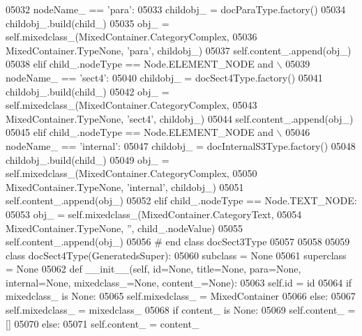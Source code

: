 \begin{DoxyCode}
{{{{{{{{{{{{{{{{{{{{{{{{{{{{{{{{{{{{{{{{{{{{{{{{{{{{{{{{{{{{{{{{{{{{{{{{{{{{{{{{{{{{{{{{{{{{{{{{{{{{{{{{{{{{{{{{{{{{{{{{{{{{{{{{{{{{{{{{{{{{{{{{{{{{{{{{{{{{{{{{{{{{{{{{{{{{{{{{{{{{{{{{{{{{{{{{{{{{{{{{{{{{{{{{{{{{{{{{{{{{{{{{{{{{{{{{{{{{{{{{{{{{{{{{{{{{{{{{{{{{{{{{{{{{{{{{{{{{{{{{{{{{{{{{{{{{{{{{{{{{{{{{{{{{{{{{{{{{{{{{{{{{{{{{{{{{05032             nodeName\_ == \textcolor{stringliteral}{'para'}:
05033             childobj\_ = docParaType.factory()
05034             childobj\_.build(child\_)
05035             obj\_ = self.mixedclass_(MixedContainer.CategoryComplex,
05036                 MixedContainer.TypeNone, \textcolor{stringliteral}{'para'}, childobj\_)
05037             self.content\_.append(obj\_)
05038         \textcolor{keywordflow}{elif} child\_.nodeType == Node.ELEMENT\_NODE \textcolor{keywordflow}{and} \(\backslash\)
05039             nodeName\_ == \textcolor{stringliteral}{'sect4'}:
05040             childobj\_ = docSect4Type.factory()
05041             childobj\_.build(child\_)
05042             obj\_ = self.mixedclass_(MixedContainer.CategoryComplex,
05043                 MixedContainer.TypeNone, \textcolor{stringliteral}{'sect4'}, childobj\_)
05044             self.content\_.append(obj\_)
05045         \textcolor{keywordflow}{elif} child\_.nodeType == Node.ELEMENT\_NODE \textcolor{keywordflow}{and} \(\backslash\)
05046             nodeName\_ == \textcolor{stringliteral}{'internal'}:
05047             childobj\_ = docInternalS3Type.factory()
05048             childobj\_.build(child\_)
05049             obj\_ = self.mixedclass_(MixedContainer.CategoryComplex,
05050                 MixedContainer.TypeNone, \textcolor{stringliteral}{'internal'}, childobj\_)
05051             self.content\_.append(obj\_)
05052         \textcolor{keywordflow}{elif} child\_.nodeType == Node.TEXT\_NODE:
05053             obj\_ = self.mixedclass_(MixedContainer.CategoryText,
05054                 MixedContainer.TypeNone, \textcolor{stringliteral}{''}, child\_.nodeValue)
05055             self.content\_.append(obj\_)
05056 \textcolor{comment}{# end class docSect3Type}
05057 
05058 
05059 \textcolor{keyword}{class }docSect4Type(GeneratedsSuper):
05060     subclass = \textcolor{keywordtype}{None}
05061     superclass = \textcolor{keywordtype}{None}
05062     \textcolor{keyword}{def }__init__(self, id=None, title=None, para=None, internal=None, mixedclass\_=None, content\_=None):
05063         self.id = id
05064         \textcolor{keywordflow}{if} mixedclass\_ \textcolor{keywordflow}{is} \textcolor{keywordtype}{None}:
05065             self.mixedclass_ = MixedContainer
05066         \textcolor{keywordflow}{else}:
05067             self.mixedclass_ = mixedclass\_
05068         \textcolor{keywordflow}{if} content\_ \textcolor{keywordflow}{is} \textcolor{keywordtype}{None}:
05069             self.content_ = []
05070         \textcolor{keywordflow}{else}:
05071             self.content_ = content\_
}}}}}}}}}}}}}}}}}}}}}}}}}}}}}}}}}}}}}}}}}}}}}}}}}}}}}}}}}}}}}}}}}}}}}}}}}}}}}}}}}}}}}}}}}}}}}}}}}}}}}}}}}}}}}}}}}}}}}}}}}}}}}}}}}}}}}}}}}}}}}}}}}}}}}}}}}}}}}}}}}}}}}}}}}}}}}}}}}}}}}}}}}}}}}}}}}}}}}}}}}}}}}}}}}}}}}}}}}}}}}}}}}}}}}}}}}}}}}}}}}}}}}}}}}}}}}}}}}}}}}}}}}}}}}}}}}}}}}}}}}}}}}}}}}}}}}}}}}}}}}}}}}}}}}}}}}}}}}}}}}}}}}}}}}}}}
\end{DoxyCode}
